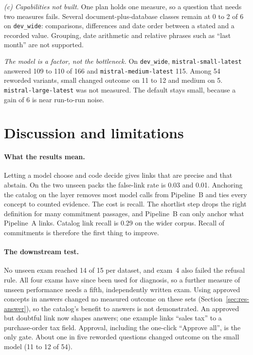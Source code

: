 \documentclass[11pt,a4paper]{article}
\begin{document}
\textit{(c) Capabilities not built.} One plan holds one measure, so a question that needs two measures fails. Several document-plus-database classes remain at 0 to 2 of 6 on \texttt{dev\_wide}: comparisons, differences and date order between a stated and a recorded value. Grouping, date arithmetic and relative phrases such as ``last month'' are not supported. %

\textit{The model is a factor, not the bottleneck.} On \texttt{dev\_wide}, \texttt{mistral-small-latest} answered 109 to 110 of 166 and \texttt{mistral-medium-latest} 115. Among 54 reworded variants, small changed outcome on 11 to 12 and medium on 5. \texttt{mistral-large-latest} was not measured. The default stays small, because a gain of 6 is near run-to-run noise. %

\section{Discussion and limitations}\label{sec:limits}
\paragraph{What the results mean.} Letting a model choose and code decide gives links that are precise and that abstain. On the two unseen packs the false-link rate is 0.03 and 0.01. Anchoring the catalog on the layer removes most model calls from Pipeline~B and ties every concept to counted evidence. The cost is recall. The shortlist step drops the right definition for many commitment passages, and Pipeline~B can only anchor what Pipeline~A links. Catalog link recall is 0.29 on the wider corpus. Recall of commitments is therefore the first thing to improve.

\paragraph{The downstream test.} No unseen exam reached 14 of 15 per dataset, and exam~4 also failed the refusal rule. All four exams have since been used for diagnosis, so a further measure of unseen performance needs a fifth, independently written exam. %
Using approved concepts in answers changed no measured outcome on these sets (Section~\ref{sec:res-answer}), so the catalog's benefit to answers is not demonstrated. An approved but doubtful link now shapes answers; one example links ``sales tax'' to a purchase-order tax field. Approval, including the one-click ``Approve all'', is the only gate. %
About one in five reworded questions changed outcome on the small model (11 to 12 of 54). %
\end{document}
